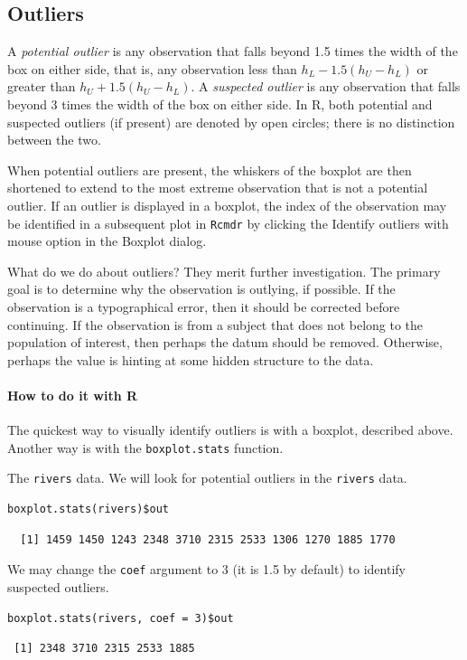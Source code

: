 \documentclass[captions=tableheading]{scrbook}
\begin{document}
\subsection{Outliers}
\label{sec-3-4-4}

\label{sub:Outliers}

A \emph{potential outlier} is any observation that falls beyond 1.5 times the width of the box on either side, that is, any observation less than \(h_{L}-1.5(h_{U}-h_{L})\) or greater than \(h_{U}+1.5(h_{U}-h_{L})\). A \emph{suspected outlier} is any observation that falls beyond 3 times the width of the box on either side. In \textsf{R}, both potential and suspected outliers (if present) are denoted by open circles; there is no distinction between the two. 

When potential outliers are present, the whiskers of the boxplot are then shortened to extend to the most extreme observation that is not a potential outlier. If an outlier is displayed in a boxplot, the index of the observation may be identified in a subsequent plot in \texttt{Rcmdr} by clicking the \textsf{Identify outliers with mouse} option in the \textsf{Boxplot} dialog.

What do we do about outliers? They merit further investigation. The primary goal is to determine why the observation is outlying, if possible. If the observation is a typographical error, then it should be corrected before continuing. If the observation is from a subject that does not belong to the population of interest, then perhaps the datum should be removed. Otherwise, perhaps the value is hinting at some hidden structure to the data.

\paragraph*{How to do it with \textsf{R}}

The quickest way to visually identify outliers is with a boxplot, described above. Another way is with the \texttt{boxplot.stats} function.

\begin{example}
The \texttt{rivers} data. We will look for potential outliers in the \texttt{rivers} data.


\begin{verbatim}
boxplot.stats(rivers)$out
\end{verbatim}

\begin{verbatim}
  [1] 1459 1450 1243 2348 3710 2315 2533 1306 1270 1885 1770
\end{verbatim}

We may change the \texttt{coef} argument to 3 (it is 1.5 by default) to identify suspected outliers.


\begin{verbatim}
boxplot.stats(rivers, coef = 3)$out
\end{verbatim}

\begin{verbatim}
 [1] 2348 3710 2315 2533 1885
\end{verbatim}

\end{example}
\end{document}
